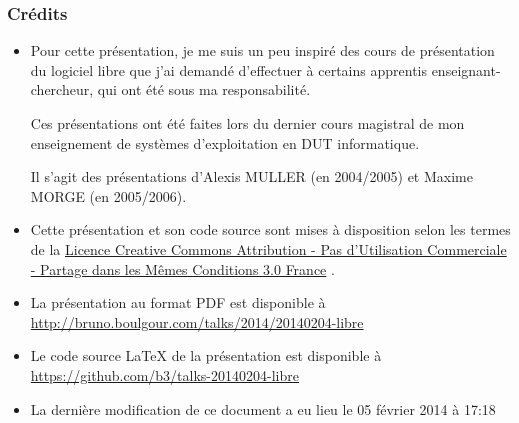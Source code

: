 \documentclass[10pt]{beamer}
\begin{document}
\begin{frame}
  \frametitle{Crédits}

  \small

  \begin{itemize}
  \item Pour cette présentation, je me suis un peu inspiré des cours de
    présentation du logiciel libre que j'ai demandé d'effectuer à certains
    apprentis enseignant-chercheur, qui ont été sous ma responsabilité.

    Ces présentations ont été faites lors du dernier cours magistral de mon
    enseignement de systèmes d'exploitation en DUT informatique.

    Il s'agit des présentations d'Alexis MULLER (en 2004/2005) et Maxime
    MORGE (en 2005/2006).
  
    \vfill
    
  \item Cette présentation et son code source sont mises à disposition
    selon les termes de la
    \href{https://creativecommons.org/licenses/by-nc-sa/3.0/fr/legalcode}{Licence
      Creative Commons Attribution - Pas d’Utilisation Commerciale - Partage
      dans les Mêmes Conditions 3.0 France} \ccbyncsa.

    \vfill

  \item La présentation au format PDF est disponible à \url{http://bruno.boulgour.com/talks/2014/20140204-libre}

    \vfill

  \item Le code source LaTeX de la présentation est disponible à \url{https://github.com/b3/talks-20140204-libre}

  \item La dernière modification de ce document a eu lieu le 05 février 2014 à 17:18 %
  \end{itemize}
\end{frame}
\end{document}
